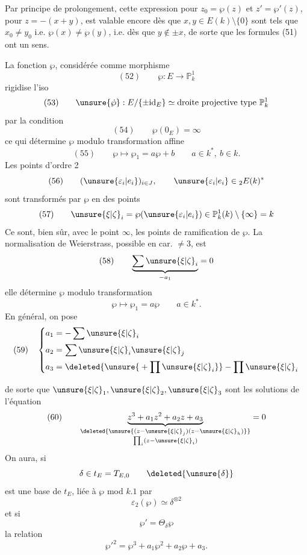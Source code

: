 Par principe de prolongement, cette expression pour $z_0=\wp(z)$ et $z'=\wp'(z)$,
pour $z=-(x+y)$, est valable encore dès que $x,y\in E(k)\setminus\{0\}$
sont tels que $x_0\ne y_0$ i.e. $\wp(x)\ne\wp(y)$, i.e. dès que
 $y\notin\pm x$, de sorte que les formules (51) ont un sens.


La fonction $\wp$, considérée comme morphisme
\[
(52)\qquad\wp:E\longrightarrow\mathbb P^1_k
\]
rigidise l'iso
\[
(53)\qquad\unsure{\dot\wp}:E/\{\pm\mathrm{id}_E\}\simeq
\text{droite projective type }\mathbb P^1_k
\]
par la condition
\[
(54)\qquad\wp(0_E)=\infty
\]
ce qui détermine $\wp$ modulo transformation affine
\[
(55)\qquad\wp\longmapsto\wp_1=a\wp+b\qquad a\in k^*,\ b\in k.
\]
Les points d'ordre 2
\[
(56)\qquad(\unsure{\varepsilon_i|e_i})_{i\in J},\qquad\unsure{\varepsilon_i|e_i}\in{}_2E(k)^*
\]
sont transformés par $\wp$ en des points
\[
(57)\qquad\unsure{\xi|\zeta}_i=\wp(\unsure{\varepsilon_i|e_i})\in\mathbb P^1_k(k)\setminus\{\infty\}=k
\]
Ce sont, bien sûr, avec le point $\infty$, les points de ramification de $\wp$.
La normalisation de Weierstrass, possible en car. $\ne3$,  est
\[
(58)\qquad\underbrace{\sum\unsure{\xi|\zeta}_i}_{-a_1}=0
\]
elle détermine $\wp$ modulo transformation
\[
\wp\longmapsto\wp_1=a\wp\qquad a\in k^*.
\]
En général, on pose
\[
(59)\quad\left\{\begin{aligned}
a_1&=-\sum\unsure{\xi|\zeta}_i\\
a_2&=\sum\unsure{\xi|\zeta}_i\unsure{\xi|\zeta}_j\\
a_3&=\deleted{\unsure{{}+\prod\unsure{\xi|\zeta}_i}}-\prod\unsure{\xi|\zeta}_i
\end{aligned}\right.
\]


de sorte que $\unsure{\xi|\zeta}_1,\unsure{\xi|\zeta}_2,\unsure{\xi|\zeta}_3$ sont les solutions de l'équation
\[
(60)\qquad\underbrace{z^3+a_1z^2+a_2z+a_3}_{
\substack{\deleted{\unsure{(z-\unsure{\xi|\zeta}_j)(z-\unsure{\xi|\zeta}_h)}}\\\prod_i(z-\unsure{\xi|\zeta}_i)}}=0
\]
On aura,  si
\[
\delta\in t_E=T_{E,0}\qquad\deleted{\unsure{\delta}}
\]
est une base de $t_E$, liée à $\wp$ mod $k.1$ par
\[
\varepsilon_2(\wp)\simeq\delta^{\otimes2}
\]
et si
\[
\wp'=\Theta_\delta\wp
\]
la relation
\[
\wp'^2=\wp^3+a_1\wp^2+a_2\wp+a_3.
\]

